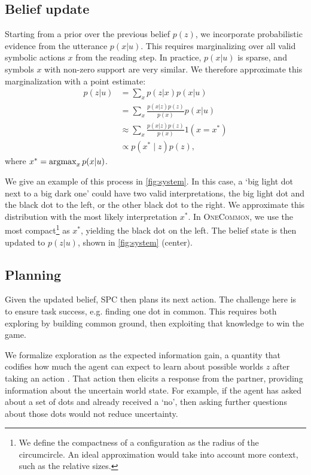 \documentclass[11pt]{article}
\newcommand{\system}{SPC}
\begin{document}
\subsection{Belief update}
Starting from a prior over the previous belief $p(z)$,
we incorporate probabilistic evidence from the utterance $p(x|u)$. This requires marginalizing over all valid symbolic actions $x$ from the reading step.
In practice, $p(x|u)$ is sparse, and symbols $x$ with non-zero support are very similar.
We therefore approximate this marginalization with a point estimate:
\begin{equation}
\label{eqn:update}
\begin{aligned}
p(z|u) &= \sum_x p(z|x)p(x|u) \\
&= \sum_x \frac{p(x|z)p(z)}{p(x)} p(x|u) \\
&\approx \sum_x \frac{p(x|z)p(z)}{p(x)} 1(x = x^*)\\
&\propto p(x^* \mid z)p(z),
\end{aligned}
\end{equation}
where $x^* = \operatorname*{argmax}_x p(x|u)$.

We give an example of this process in \autoref{fig:system}.
In this case, a `big light dot next to a big dark one' could have two valid interpretations, the big light dot and the black dot to the left, or the other black dot to the right.
We approximate this distribution with the most likely interpretation $x^*$.
In \textsc{OneCommon}, we use the most compact\footnote{We define the compactness of a configuration as the radius of the circumcircle. An ideal approximation would take into account more context, such as the relative sizes.} as $x^*$, yielding the black dot on the left.
The belief state is then updated to $p(z|u)$, shown in \autoref{fig:system} (center).

\subsection{Planning}
Given the updated belief, \system{} then plans its next action.
The challenge here is to ensure task success, e.g. finding one dot in common. This requires both exploring by building common ground, then exploiting that knowledge to win the game.

We formalize exploration as the expected information gain, a quantity that codifies how much the agent can expect to learn about possible worlds $z$ after taking an action \citep{lindley}.
That action then elicits a response from the partner, providing information about the uncertain world state.
For example, if the agent has asked about a set of dots and already received a `no', then asking further questions about those dots would not reduce uncertainty.
\end{document}
